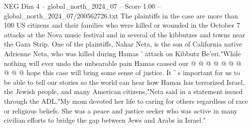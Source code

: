 \begin{textsample}{NEG Dim 4 – global\_north\_2024\_07 – Score 1.00 – global\_north\_2024\_07/200562726.txt}
The plaintiffs in the case are more than 100 US citizens and their families who were killed or wounded in the October 7 attacks at the Nova music festival and in several of the kibbutzes and towns near the Gaza Strip.
One of the plaintiffs, Nahar Neta, is the son of California native Adrienne Neta, who was killed during Hamas ' attack on Kibbutz Be'eri."While nothing will ever undo the unbearable pain Hamas caused our @ @ @ @ @ @ @ @ @ @ hope this case will bring some sense of justice.
It ' s important for us to be able to tell our stories so the world can hear how Hamas has terrorized Israel, the Jewish people, and many American citizens,"Neta said in a statement issued through the ADL."My mom devoted her life to caring for others regardless of race or religious beliefs.
She was a peace and justice seeker who was active in many civilian efforts to bridge the gap between Jews and Arabs in Israel."

\end{textsample}
